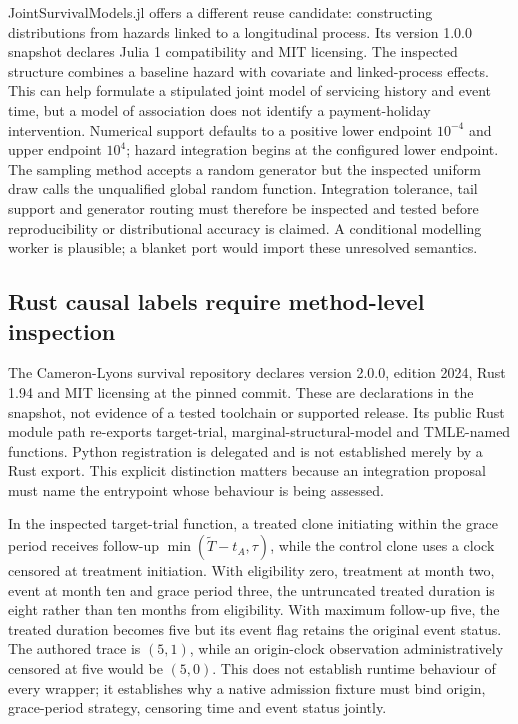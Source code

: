 JointSurvivalModels.jl offers a different reuse candidate: constructing distributions
from hazards linked to a longitudinal process. Its version 1.0.0 snapshot declares
Julia 1 compatibility and MIT licensing. The inspected structure combines a baseline
hazard with covariate and linked-process effects. This can help formulate a stipulated
joint model of servicing history and event time, but a model of association does not
identify a payment-holiday intervention. Numerical support defaults to a positive
lower endpoint $10^{-4}$ and upper endpoint $10^4$; hazard integration begins at
the configured lower endpoint. The sampling method accepts a random generator but
the inspected uniform draw calls the unqualified global random function. Integration
tolerance, tail support and generator routing must therefore be inspected and tested
before reproducibility or distributional accuracy is claimed. A conditional modelling
worker is plausible; a blanket port would import these unresolved semantics.
\citep{exec24_survivalother_juliajoint}

\subsection{Rust causal labels require method-level inspection}
The Cameron-Lyons survival repository declares version 2.0.0, edition 2024,
Rust 1.94 and MIT licensing at the pinned commit. These are declarations in the
snapshot, not evidence of a tested toolchain or supported release. Its public Rust
module path re-exports target-trial, marginal-structural-model and TMLE-named
functions. Python registration is delegated and is not established merely by a
Rust export. This explicit distinction matters because an integration proposal must
name the entrypoint whose behaviour is being assessed.~\citep{exec24_survivalother_rustcore}

In the inspected target-trial function, a treated clone initiating within the grace
period receives follow-up $\min(\widetilde T-t_A,\tau)$, while the control clone
uses a clock censored at treatment initiation. With eligibility zero, treatment at
month two, event at month ten and grace period three, the untruncated treated duration
is eight rather than ten months from eligibility. With maximum follow-up five, the
treated duration becomes five but its event flag retains the original event status.
The authored trace is $(5,1)$, while an origin-clock observation administratively
censored at five would be $(5,0)$. This does not establish runtime behaviour of
every wrapper; it establishes why a native admission fixture must bind origin,
grace-period strategy, censoring time and event status jointly.
\citep{exec24_survivalother_rustcore,exec24_survivalother_reference}

